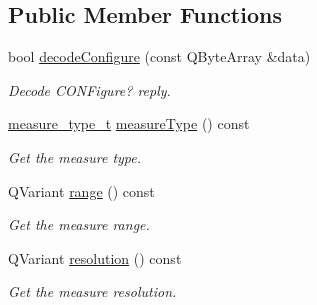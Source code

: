 \subsection*{Public Member Functions}
\begin{DoxyCompactItemize}
\item 
\hypertarget{classmdt_frame_codec_scpi_u3606_a_a178cc4f868b15b8c4591d8333afa84e4}{
bool \hyperlink{classmdt_frame_codec_scpi_u3606_a_a178cc4f868b15b8c4591d8333afa84e4}{decodeConfigure} (const QByteArray \&data)}
\label{classmdt_frame_codec_scpi_u3606_a_a178cc4f868b15b8c4591d8333afa84e4}

\begin{DoxyCompactList}\small\item\em Decode CONFigure? reply. \end{DoxyCompactList}\item 
\hypertarget{classmdt_frame_codec_scpi_u3606_a_a590c72641f56e0f0db6547244b3643ef}{
\hyperlink{classmdt_frame_codec_scpi_u3606_a_a3d7a1de14d77797a08e3d2991fa9f004}{measure\_\-type\_\-t} \hyperlink{classmdt_frame_codec_scpi_u3606_a_a590c72641f56e0f0db6547244b3643ef}{measureType} () const }
\label{classmdt_frame_codec_scpi_u3606_a_a590c72641f56e0f0db6547244b3643ef}

\begin{DoxyCompactList}\small\item\em Get the measure type. \end{DoxyCompactList}\item 
\hypertarget{classmdt_frame_codec_scpi_u3606_a_ab850c07848d9311725d2632abbd2f04a}{
QVariant \hyperlink{classmdt_frame_codec_scpi_u3606_a_ab850c07848d9311725d2632abbd2f04a}{range} () const }
\label{classmdt_frame_codec_scpi_u3606_a_ab850c07848d9311725d2632abbd2f04a}

\begin{DoxyCompactList}\small\item\em Get the measure range. \end{DoxyCompactList}\item 
\hypertarget{classmdt_frame_codec_scpi_u3606_a_acc4751a5bb5da24e83b8ae77009b2c92}{
QVariant \hyperlink{classmdt_frame_codec_scpi_u3606_a_acc4751a5bb5da24e83b8ae77009b2c92}{resolution} () const }
\label{classmdt_frame_codec_scpi_u3606_a_acc4751a5bb5da24e83b8ae77009b2c92}

\begin{DoxyCompactList}\small\item\em Get the measure resolution. \end{DoxyCompactList}\end{DoxyCompactItemize}


